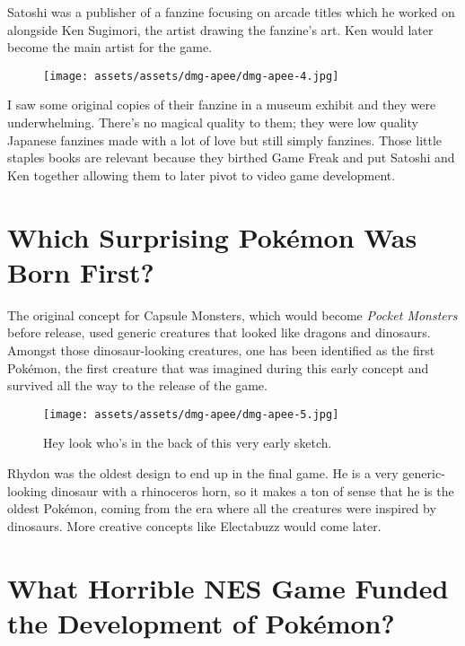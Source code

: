 \documentclass{book}
\begin{document}
Satoshi was a publisher of a fanzine focusing on arcade titles which he worked on alongside Ken Sugimori, the artist drawing the fanzine’s art. Ken would later become the main artist for the game.

\begin{figure}[hbt]
\vskip 10pt
\centering \texttt{[image: assets/assets/dmg-apee/dmg-apee-4.jpg]}
\vskip 6pt
\end{figure}

I saw some original copies of their fanzine in a museum exhibit and they were underwhelming. There’s no magical quality to them; they were low quality Japanese fanzines made with a lot of love but still simply fanzines. Those little staples books are relevant because they birthed Game Freak and put Satoshi and Ken together allowing them to later pivot to video game development.

\FloatBarrier\needspace{10mm}\section*{Which Surprising Pokémon Was Born First?}\nopagebreak[4]

The original concept for Capsule Monsters, which would become \emph{Pocket Monsters} before release, used generic creatures that looked like dragons and dinosaurs. Amongst those dinosaur-looking creatures, one has been identified as the first Pokémon, the first creature that was imagined during this early concept and survived all the way to the release of the game.

\begin{figure}[hbt]
\vskip 10pt
\centering \texttt{[image: assets/assets/dmg-apee/dmg-apee-5.jpg]}\par\pagetwodescription Hey look who’s in the back of this very early sketch.
\vskip 6pt
\end{figure}

Rhydon was the oldest design to end up in the final game. He is a very generic-looking dinosaur with a rhinoceros horn, so it makes a ton of sense that he is the oldest Pokémon, coming from the era where all the creatures were inspired by dinosaurs. More creative concepts like Electabuzz would come later.

\FloatBarrier\needspace{10mm}\section*{What Horrible NES Game Funded the Development of Pokémon?}\nopagebreak[4]
\end{document}
